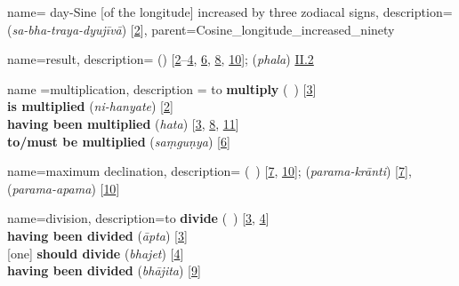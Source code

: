 {
        name= {day-Sine [of the longitude] increased by three zodiacal signs},
        description={ (\textit{sa-bha-traya-dyujīvā}) [\hyperlink{SEpass2}{2}]},
        parent={Cosine_longitude_increased_ninety}   
}


{
        name={result},
        description={ (\hasil) [\hyperlink{PEpass2}{2}--\hyperlink{PEpass4}{4}, \hyperlink{PEpass6}{6}, \hyperlink{PEpass8}{8}, \hyperlink{PEpass10}{10}];  (\textit{phala}) \hyperlink{Sii2}{II.2}}
}

{
        name ={multiplication},
        description ={\newline
           to \textbf{multiply}\quad {} (\darb\ \kardan) [\hyperlink{PEpass3}{3}]\\[0.2\baselineskip]
        \textbf{is multiplied}\quad {} (\textit{ni-hanyate}) [\hyperlink{SEpass2}{2}]\\[0.2\baselineskip]
         \textbf{having been multiplied}\quad {} (\textit{hata}) [\hyperlink{SEpass3}{3}, \hyperlink{SEpass8}{8}, \hyperlink{SEpass11}{11}]\\[0.2\baselineskip]
         \textbf{to/must be multiplied}\quad {} (\textit{saṃguṇya}) [\hyperlink{SEpass6}{6}]}
}

{
        name={maximum declination},
        description={ (\mayl\idafaconsonant\ \kulli) [\hyperlink{PEpass7}{7}, \hyperlink{PEpass10}{10}];  (\textit{parama-krānti}) [\hyperlink{SEpass7}{7}],  (\textit{parama-apama}) [\hyperlink{SEpass10}{10}]}
}        
        
{
        name={division},
        description={\newline to \textbf{divide}\quad{} (\qismat\ \kardan) [\hyperlink{PEpass3}{3}, \hyperlink{PEpass4}{4}]\\[.2\baselineskip]
        \textbf{having been divided}\quad {} (\textit{āpta}) [\hyperlink{SEpass3}{3}] \\[.2\baselineskip]
        {[one]} \textbf{should divide}\quad {} (\textit{bhajet}) [\hyperlink{SEpass4}{4}] \\[.2\baselineskip]
        \textbf{having been divided}\quad {} (\textit{bhājita}) [\hyperlink{SEpass9}{9}]}
}   


